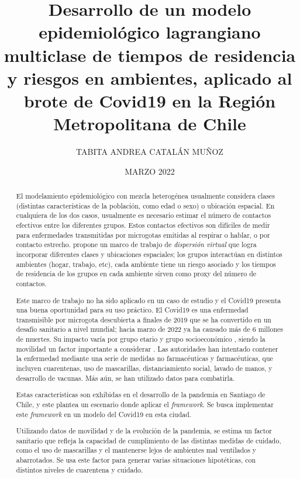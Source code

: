 \documentclass[upright, contnum]{umemoria}
\author{TABITA ANDREA CATALÁN MUÑOZ}
\title{Desarrollo de un modelo epidemiológico lagrangiano multiclase de tiempos de residencia y riesgos en ambientes, aplicado al brote de Covid19 en la Región Metropolitana de Chile}
\date{MARZO 2022}
\begin{document}
\frontmatter
\maketitle

\begin{abstract}
El modelamiento epidemiológico con mezcla heterogénea usualmente considera clases (distintas características de la población, como edad o sexo) o ubicación espacial. En cualquiera de los dos casos, usualmente es necesario estimar el número de contactos efectivos entre los diferentes grupos. Estos contactos efectivos son difíciles de medir para enfermedades transmitidas por microgotas emitidas al respirar o hablar, o por contacto estrecho. \cite{Bichara2018} propone un marco de trabajo de \textit{dispersión virtual} que logra incorporar diferentes clases y ubicaciones espaciales; los grupos interactúan en distintos ambientes (hogar, trabajo, etc), cada ambiente tiene un riesgo asociado y los tiempos de residencia de los grupos en cada ambiente sirven como proxy del número de contactos. 

Este marco de trabajo no ha sido aplicado en un caso de estudio y el Covid19 presenta una buena oportunidad para su uso práctico. El Covid19 es una enfermedad transmisible por microgota descubierta a finales de 2019 que se ha convertido en un desafío sanitario a nivel mundial; hacia marzo de 2022 ya ha causado más de 6 millones de muertes. Su impacto varía por grupo etario \cite{} y grupo socioeconómico \cite{Chang2021}, siendo la movilidad un factor importante a considerar \cite{Lai2020}. Las autoridades han intentado contener la enfermedad mediante una serie de medidas no farmacéuticas y farmacéuticas, que incluyen cuarentenas, uso de mascarillas, distanciamiento social, lavado de manos, y desarrollo de vacunas. Más aún, se han utilizado datos para combatirla. 

Estas características son exhibidas en el desarrollo de la pandemia en Santiago de Chile, y este plantea un escenario donde aplicar el \textit{framework}. Se busca implementar este \textit{framework} en un modelo del Covid19 en esta ciudad. 

Utilizando datos de movilidad y de la evolución de la pandemia, se estima un factor sanitario que refleja la capacidad de cumplimiento de las distintas medidas de cuidado, como el uso de mascarillas y el mantenerse lejos de ambientes mal ventilados y abarrotados. Se usa este factor para generar varias situaciones hipotéticas, con distintos niveles de cuarentena y cuidado. 


\end{abstract}
\end{document}
